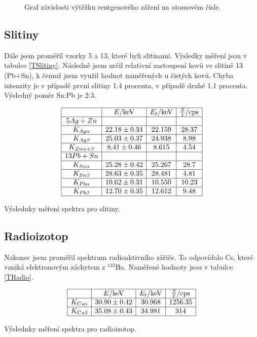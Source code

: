 \documentclass[a4paper,12pt]{article}
\begin{document}
\begin{figure}

\caption{Graf závislosti výtěžku rentgenového záření na atomovém čísle.}
\label{G1}
\end{figure}

\subsection{Slitiny}
Dále jsem proměřil vzorky 5 a 13, které byli slitinami. Výsledky měření jsou v tabulce \ref{TSlitiny}. Následně jsem určil relativní zastoupení kovů ve slitině 13 (Pb+Sn), k čemuž jsem využil hodnot naměřených u čistých kovů. Chyba intenzity je v případě první slitiny 1.4 procenta, v případě druhé 1.1 procenta. Výsledný poměr Sn:Pb je 2:3.

\begin{table}
$$
\begin{array}{|c|c|c|c|}
\hline
&   E/\mbox{keV}&   E_t/\mbox{keV}&   \frac{S}{t}/\mbox{cps} \\ \hline
5 Ag+Zn&&& \\ \hline
K_{Ag\alpha}& 22.18\pm 0.34&   22.159&   28.37 \\ \hline
K_{Ag\beta}& 25.03\pm 0.37&   24.938&   8.98 \\ \hline
K_{Zn\alpha + \beta}& 8.41\pm 0.46&   8.615&   4.54 \\ \hline
13 Pb+Sn&&& \\ \hline
K_{Sn\alpha}& 25.28\pm 0.42&   25.267&  28.7 \\ \hline
K_{Sn\beta}& 28.63\pm 0.35&   28.481&   4.81 \\ \hline
K_{Pb\alpha}& 10.62\pm 0.31&   10.550&   10.23 \\ \hline
K_{Pb\beta}& 12.70\pm 0.35&   12.612&   9.48 \\ \hline
\end{array}
$$
\caption{Výslednky měření spektra pro slitiny.}
\label{TSlitiny}
\end{table}

\subsection{Radioizotop}
Nakonec jsem proměřil spektrum radioaktivního zářiče. To odpovídalo Cs, které vzniká elektronovým záchytem z $^{133}$Ba. 
Naměřené hodnoty jsou v tabulce \ref{TRadio}.

\begin{table}
$$
\begin{array}{|c|c|c|c|}
\hline
&   E/\mbox{keV}&   E_t/\mbox{keV}&   \frac{S}{t}/\mbox{cps} \\ \hline
K_{Cs\alpha}&   30.90\pm 0.42&   30.968&   1256.35 \\ \hline
K_{Cs\beta}&    35.08\pm 0.43&  34.981&   314 \\ \hline
\end{array}
$$
\caption{Výslednky měření spektra pro radioizotop.}
\label{TRadio}
\end{table}
\end{document}
